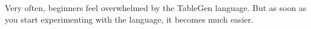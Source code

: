 
Very often, beginners feel overwhelmed by the TableGen language. But as soon as you start experimenting with the language, it becomes much easier.




